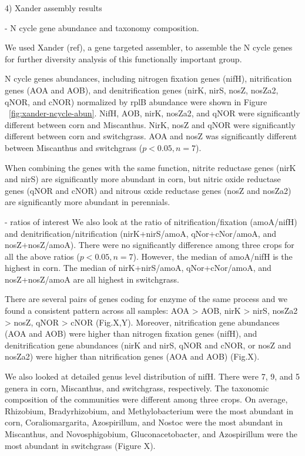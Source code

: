 \documentclass[12pt]{article}
\begin{document}
4) Xander assembly results

- N cycle gene abundance and taxonomy composition.

We used Xander (ref), a gene targeted assembler, to assemble the N cycle genes for further diversity analysis of this functionally important group.

N cycle genes abundances, including nitrogen fixation genes (nifH), nitrification genes (AOA and AOB), and denitrification genes (nirK, nirS, nosZ, nosZa2, qNOR, and cNOR) normalized by rplB abundance were shown in Figure ~\ref{fig:xander-ncycle-abun}. NifH, AOB, nirK, nosZa2, and qNOR were significantly different between corn and Miscanthus. NirK, nosZ and qNOR  were significantly different between corn and switchgrass. AOA and nosZ was significantly different between Miscanthus and switchgrass ($p < 0.05, n = 7$).

When combining the genes with the same function, nitrite reductase genes (nirK and nirS) are significantly more abundant in corn, but nitric oxide reductase genes (qNOR and cNOR) and nitrous oxide reductase genes (nosZ and nosZa2) are significantly more abundant in perennials.

- ratios of interest
We also look at the ratio of nitrification/fixation (amoA/nifH) and denitrification/nitrification (nirK+nirS/amoA, qNor+cNor/amoA, and nosZ+nosZ/amoA). There were no significantly difference among three crops for all the above ratios ($p < 0.05, n = 7$). However, the median of amoA/nifH is the highest in corn. The median of nirK+nirS/amoA, qNor+cNor/amoA, and nosZ+nosZ/amoA are all highest in switchgrass.

There are several pairs of genes coding for enzyme of the same process and we found a consistent pattern across all samples: AOA {\textgreater} AOB, nirK {\textgreater} nirS, nosZa2 {\textgreater} nosZ, qNOR {\textgreater} cNOR (Fig.X,Y). Moreover, nitrification gene abundances (AOA and AOB) were higher than nitrogen fixation genes (nifH), and denitrification gene abundances (nirK and nirS, qNOR and cNOR, or nosZ and nosZa2) were higher than nitrification genes (AOA and AOB) (Fig.X).

We also looked at detailed genus level distribution of nifH. There were 7, 9, and 5 genera in corn, Miscanthus, and switchgrass, respectively. The taxonomic composition of the communities were different among three crops. On average, Rhizobium, Bradyrhizobium, and Methylobacterium were the most abundant in corn, Coraliomargarita, Azospirillum, and Nostoc were the most abundant in Miscanthus, and Novosphigobium, Gluconacetobacter, and Azospirillum were the most abundant in switchgrass (Figure X).
\end{document}
